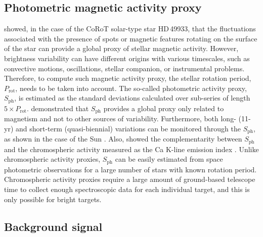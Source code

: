 \documentclass[twocolumn]{aastex61}%
\begin{document}
\subsection{Photometric magnetic activity proxy}\label{sec:sph}

\citet{Garcia2010} showed, in the case of the CoRoT solar-type star HD\,49933, that the fluctuations associated with the presence of spots or magnetic features rotating on the surface of the star can provide a global proxy of stellar magnetic activity. However, brightness variability can have different origins with various timescales, such as convective motions, oscillations, stellar companion, or instrumental problems. Therefore, to compute such magnetic activity proxy, the stellar rotation period, $P_\text{rot}$, needs to be taken into account. The so-called photometric activity proxy, $S_\text{ph}$, is estimated as the standard deviations calculated over sub-series of length $5\times P_\text{rot}$. \citet{Mathur2014} demonstrated that $S_\text{ph}$ provides a global proxy only related to magnetism and not to other sources of variability. Furthermore, both long- (11-yr) and short-term (quasi-biennial) variations can be monitored through the $S_\text{ph}$, as shown in the case of the Sun \citep{Salabert2017}. Also, \citet{Salabert2016b} showed the complementarity between $S_\text{ph}$ and the chromospheric activity measured as the Ca K-line emission index \citep{Wilson1978}. Unlike chromospheric activity proxies, $S_\text{ph}$ can be easily estimated from space photometric observations for a large number of stars with known rotation period. Chromospheric activity proxies require a large amount of ground-based telescope time to collect enough spectroscopic data for each individual target, and this is only possible for bright targets.

\subsection{Background signal}\label{sec:backg}
\end{document}
